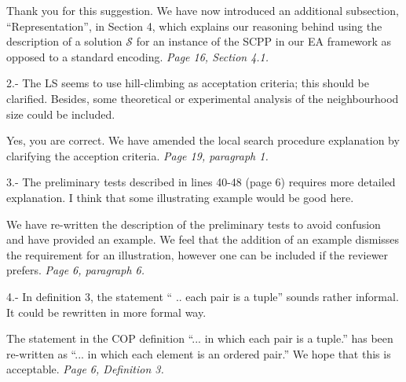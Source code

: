\documentclass[a4paper,11pt]{article}
\newcommand{\ahc}[1]{{\color{myBlue}#1}}
\newcommand{\ea}[1]{{\color{myRed}#1}}
\newcommand{\resp}[1]{{\color{myDarkBlue2}#1}} %
\begin{document}
\resp{Thank you for this suggestion. We have now introduced an additional subsection, ``Representation'', in Section 4, which explains our reasoning behind using the description of a solution $\mathcal{S}$ for an instance of the SCPP in our EA framework as opposed to a standard encoding. \textit{Page 16, Section 4.1.}}


2.- The LS seems to use hill-climbing as acceptation criteria; this should be clarified. Besides, some theoretical or experimental analysis of the neighbourhood size could be included. %


\resp{Yes, you are correct. We have amended the local search procedure explanation by clarifying the acception criteria. \textit{Page 19, paragraph 1.}}


3.- The preliminary tests described in lines 40-48 (page 6) requires more detailed explanation. I think that some illustrating example would be good here. %


\resp{We have re-written the description of the preliminary tests to avoid confusion and have provided an example. We feel that the addition of an example dismisses the requirement for an illustration, however one can be included if the reviewer prefers. \textit{Page 6, paragraph 6.}}


4.- In definition 3, the statement `` .. each pair is a tuple'' sounds rather informal. It could be rewritten in more formal way. %

\resp{The statement in the COP definition ``... in which each pair is a tuple.'' has been re-written as ``... in which each element is an ordered pair.'' We hope that this is acceptable. \textit{Page 6, Definition 3.}}

\end{document}
